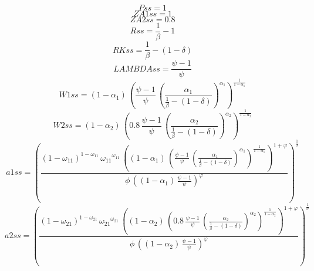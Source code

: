 \begin{dmath*}
Pss = 1
\end{dmath*}
\begin{dmath*}
ZA1ss = 1
\end{dmath*}
\begin{dmath*}
ZA2ss = 0.8
\end{dmath*}
\begin{dmath*}
Rss = \frac{1}{{{\beta}}}-1
\end{dmath*}
\begin{dmath*}
RKss = \frac{1}{{{\beta}}}-\left(1-{{\delta}}\right)
\end{dmath*}
\begin{dmath*}
LAMBDAss = \frac{{{\psi}}-1}{{{\psi}}}
\end{dmath*}
\begin{dmath*}
W1ss = \left(1-{{\alpha_{1}}}\right)\, \left(\frac{{{\psi}}-1}{{{\psi}}}\, \left(\frac{{{\alpha_{1}}}}{\frac{1}{{{\beta}}}-\left(1-{{\delta}}\right)}\right)^{{{\alpha_{1}}}}\right)^{\frac{1}{1-{{\alpha_{1}}}}}
\end{dmath*}
\begin{dmath*}
W2ss = \left(1-{{\alpha_{2}}}\right)\, \left(0.8\, \frac{{{\psi}}-1}{{{\psi}}}\, \left(\frac{{{\alpha_{2}}}}{\frac{1}{{{\beta}}}-\left(1-{{\delta}}\right)}\right)^{{{\alpha_{2}}}}\right)^{\frac{1}{1-{{\alpha_{2}}}}}
\end{dmath*}
\begin{dmath*}
a1ss = \left(\frac{\left(1-{{\omega_{11}}}\right)^{1-{{\omega_{11}}}}\, {{\omega_{11}}}^{{{\omega_{11}}}}\, \left(\left(1-{{\alpha_{1}}}\right)\, \left(\frac{{{\psi}}-1}{{{\psi}}}\, \left(\frac{{{\alpha_{1}}}}{\frac{1}{{{\beta}}}-\left(1-{{\delta}}\right)}\right)^{{{\alpha_{1}}}}\right)^{\frac{1}{1-{{\alpha_{1}}}}}\right)^{1+{{\varphi}}}}{{{\phi}}\, \left(\left(1-{{\alpha_{1}}}\right)\, \frac{{{\psi}}-1}{{{\psi}}}\right)^{{{\varphi}}}}\right)^{\frac{1}{{{\sigma}}}}
\end{dmath*}
\begin{dmath*}
a2ss = \left(\frac{\left(1-{{\omega_{21}}}\right)^{1-{{\omega_{21}}}}\, {{\omega_{21}}}^{{{\omega_{21}}}}\, \left(\left(1-{{\alpha_{2}}}\right)\, \left(0.8\, \frac{{{\psi}}-1}{{{\psi}}}\, \left(\frac{{{\alpha_{2}}}}{\frac{1}{{{\beta}}}-\left(1-{{\delta}}\right)}\right)^{{{\alpha_{2}}}}\right)^{\frac{1}{1-{{\alpha_{2}}}}}\right)^{1+{{\varphi}}}}{{{\phi}}\, \left(\left(1-{{\alpha_{2}}}\right)\, \frac{{{\psi}}-1}{{{\psi}}}\right)^{{{\varphi}}}}\right)^{\frac{1}{{{\sigma}}}}
\end{dmath*}
